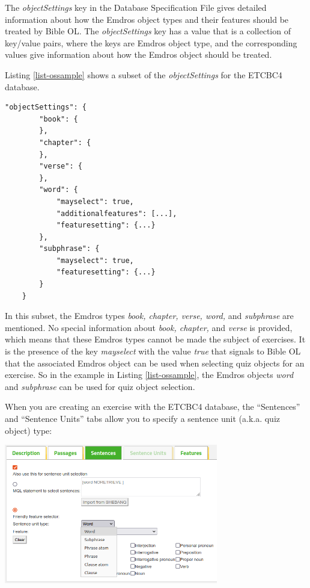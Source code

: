 \documentclass[11pt,oneside,a4paper]{memoir}
\begin{document}
The \emph{objectSettings} key in the Database Specification File gives detailed information about
how the Emdros object types and their features should be treated by Bible OL. The
\emph{objectSettings} key has a value that is a collection of key/value pairs, where the keys are
Emdros object type, and the corresponding values give information about how the Emdros object should be
treated.

Listing \ref{list-ossample} shows a subset of the \emph{objectSettings} for the ETCBC4 database.

\begin{lstlisting}[caption=A sample objectSettings value,label=list-ossample]
    "objectSettings": {
        "book": {
        },
        "chapter": {
        },
        "verse": {
        },
        "word": {
            "mayselect": true,
            "additionalfeatures": [...],
            "featuresetting": {...}
        },
        "subphrase": {
            "mayselect": true,
            "featuresetting": {...}
        }
    }
\end{lstlisting}

In this subset, the Emdros types \emph{book, chapter, verse, word,} and \emph{subphrase} are
mentioned. No special information about \emph{book, chapter,} and \emph{verse} is provided, which
means that these Emdros types cannot be made the subject of exercises. It is the presence of the key
\emph{mayselect} with the value \emph{true} that signals to Bible OL that the associated Emdros
object can be used when selecting quiz objects for an exercise. So in the example in Listing
\ref{list-ossample}, the Emdros objects \emph{word} and \emph{subphrase} can be used for quiz object
selection.

When you are creating an exercise with the ETCBC4 database, the ``Sentences'' and ``Sentence Units''
tabs allow you to specify a sentence unit (a.k.a. quiz object) type:

\begin{center}
  \includegraphics[width=0.7\textwidth]{senselect.png}
\end{center}
\end{document}
